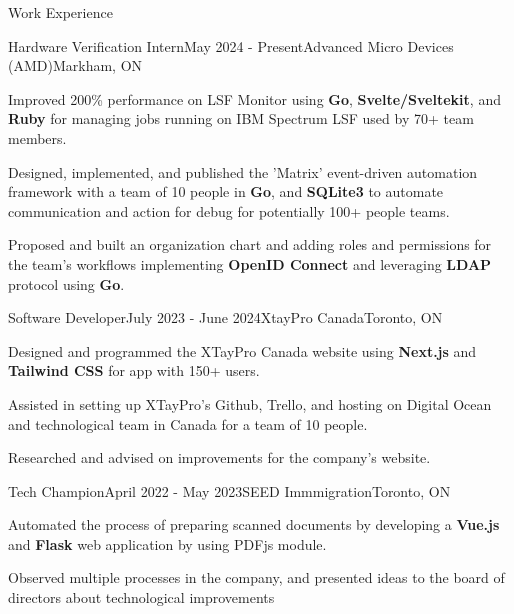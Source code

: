 \documentclass[
	11pt, %
]{resume} %
\begin{document}
\begin{rSection}{Work Experience}

	\begin{rSubsection}{Hardware Verification Intern}{May 2024 - Present}{Advanced Micro Devices (AMD)}{Markham, ON}
	\item Improved 200\% performance on LSF Monitor using \textbf{Go}, \textbf{Svelte/Sveltekit}, and \textbf{Ruby} for managing jobs running on IBM Spectrum LSF used by 70+ team members.
	\item Designed, implemented, and published the 'Matrix' event-driven automation framework with a team of 10 people in \textbf{Go}, and \textbf{SQLite3} to automate communication and action for debug for potentially 100+ people teams.
	\item Proposed and built an organization chart and adding roles and permissions for the team's workflows implementing \textbf{OpenID Connect} and leveraging \textbf{LDAP} protocol using \textbf{Go}.
	\end{rSubsection}


	\begin{rSubsection}{Software Developer}{July 2023 - June 2024}{XtayPro Canada}{Toronto, ON}
		\item Designed and programmed the XTayPro Canada website using \textbf{Next.js} and \textbf{Tailwind CSS} for app with 150+ users.
		\item Assisted in setting up XTayPro's Github, Trello, and hosting on Digital Ocean and technological team in Canada for a team of 10 people.
		\item Researched and advised on improvements for the company's website.
	\end{rSubsection}


	\begin{rSubsection}{Tech Champion}{April 2022 - May 2023}{SEED Immmigration}{Toronto, ON}
		\item Automated the process of preparing scanned documents by developing a \textbf{Vue.js} and \textbf{Flask} web application by using PDFjs module.
		\item Observed multiple processes in the company, and presented ideas to the board of directors about technological improvements
	\end{rSubsection}


\end{rSection}
\end{document}
